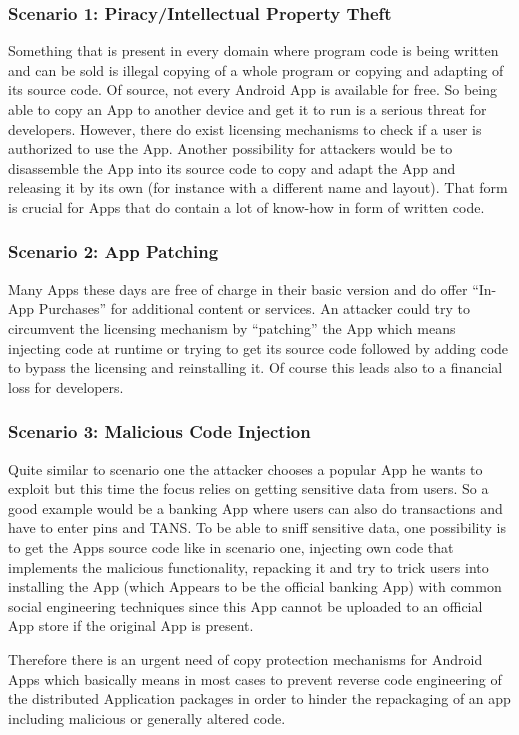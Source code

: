 \subsubsection*{Scenario 1: Piracy/Intellectual Property Theft}
Something that is present in every domain where program code is being written
and can be sold is illegal copying of a whole program or copying and adapting of
its source code. Of source, not every Android App is available for free. So being
able to copy an App to another device and get it to run is a serious threat for developers. However, there do exist licensing mechanisms to check if a user is 
authorized to use the App. Another possibility for attackers would be to disassemble
the App into its source code to copy and adapt the App and releasing it by its own
(for instance with a different name and layout).
That form is crucial for Apps that do contain a lot of know-how in form of written code.



\subsubsection*{Scenario 2: App Patching}
Many Apps these days are free of charge in their basic version and
do offer ``In-App Purchases'' for additional content or services.
An attacker could try to circumvent the licensing mechanism 
by ``patching'' the App which means injecting code at runtime or trying to get its source
code followed by adding code to bypass the licensing and reinstalling it. Of course this
leads also to a financial loss for developers. 

\subsubsection*{Scenario 3: Malicious Code Injection}
Quite similar to scenario one the attacker chooses a popular App he wants to exploit 
but this time the focus relies on getting sensitive data from users. So a good example
would be a banking App where users can also do transactions and have to enter pins and TANS. To be able to sniff sensitive data, one possibility is to get the Apps source code
like in scenario one, injecting own code that implements the malicious functionality, repacking it and try to trick users into installing the App (which Appears to be the
official banking App) with common social engineering techniques since this App cannot be
uploaded to an official App store if the original App is present. 



Therefore there is an urgent need of copy protection mechanisms
for Android Apps which basically means in most cases to prevent reverse code engineering of the distributed Application packages in order to hinder the repackaging of an app including malicious or generally altered code. 
